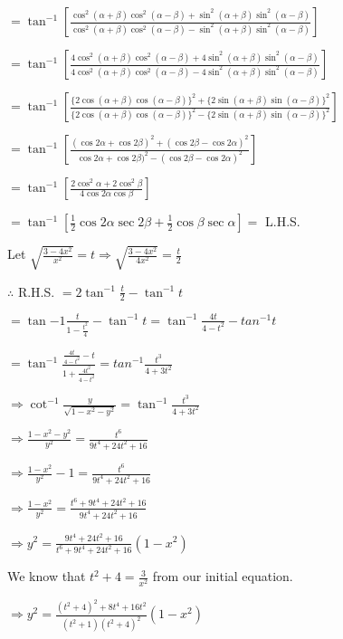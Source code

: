   $= \tan^{-1}\left[\frac{\cos^2(\alpha + \beta)\cos^2(\alpha - \beta) + \sin^2(\alpha + \beta)\sin^2(\alpha -
    \beta)}{\cos^2(\alpha + \beta)\cos^2(\alpha - \beta) - \sin^2(\alpha + \beta)\sin^2(\alpha - \beta)}\right]$

  $= \tan^{-1}\left[\frac{4\cos^2(\alpha + \beta)\cos^2(\alpha - \beta) + 4\sin^2(\alpha + \beta)\sin^2(\alpha -
    \beta)}{4\cos^2(\alpha + \beta)\cos^2(\alpha - \beta) - 4\sin^2(\alpha + \beta)\sin^2(\alpha - \beta)}\right]$

  $= \tan^{-1}\left[\frac{\{2\cos(\alpha + \beta)\cos(\alpha - \beta)\}^2 + \{2\sin(\alpha + \beta)\sin(\alpha -
    \beta)\}^2}{\{2\cos(\alpha + \beta)\cos(\alpha - \beta)\}^2 - \{2\sin(\alpha + \beta)\sin(\alpha - \beta)\}^2}\right]$

  $=\tan^{-1}\left[\frac{(\cos2\alpha + \cos2\beta)^2 + (\cos2\beta - \cos2\alpha)^2}{\cos2\alpha + \cos2\beta)^2 -
    (\cos2\beta - \cos2\alpha)^2}\right]$

  $= \tan^{-1}\left[\frac{2\cos^2\alpha + 2\cos^2\beta}{4\cos2\alpha\cos\beta}\right]$

  $= \tan^{-1}\left[\frac{1}{2}\cos2\alpha\sec2\beta + \frac{1}{2}\cos\beta\sec\alpha\right] =$ L.H.S.

\item Let $\sqrt{\frac{3 - 4x^2}{x^2}} = t \Rightarrow \sqrt{\frac{3 - 4x^2}{4x^2}} = \frac{t}{2}$

  $\therefore$ R.H.S. $= 2\tan^{-1}\frac{t}{2} - \tan^{-1}t$

  $= \tan{-1}\frac{t}{1 - \frac{t^2}{4}} - \tan^{-1}t = \tan^{-1}\frac{4t}{4 - t^2} - tan^{-1}t$

  $= \tan^{-1}\frac{\frac{4t}{4 - t^2} - t}{1 + \frac{4t^2}{4 - t^2}} = tan^{-1}\frac{t^3}{4 + 3t^2}$

  $\Rightarrow \cot^{-1}\frac{y}{\sqrt{1 - x^2 - y^2}} = \tan^{-1}\frac{t^3}{4 + 3t^2}$

  $\Rightarrow \frac{1 - x^2 - y^2}{y^2} = \frac{t^6}{9t^4 + 24t^2 + 16}$

  $\Rightarrow \frac{1 - x^2}{y^2} - 1 = \frac{t^6}{9t^4 + 24t^2 + 16}$

  $\Rightarrow \frac{1 - x^2}{y^2} = \frac{t^6 + 9t^4 + 24t^2  + 16}{9t^4 + 24t^2 + 16}$

  $\Rightarrow y^2 = \frac{9t^4 + 24t^2 + 16}{t^6 + 9t^4 + 24t^2  + 16}(1 - x^2)$

  We know that $t^2 + 4 = \frac{3}{x^2}$ from our initial equation.

  $\Rightarrow y^2 = \frac{(t^2 + 4)^2 + 8t^4 + 16t^2}{(t^2 + 1)(t^2 + 4)^2}(1 - x^2)$


